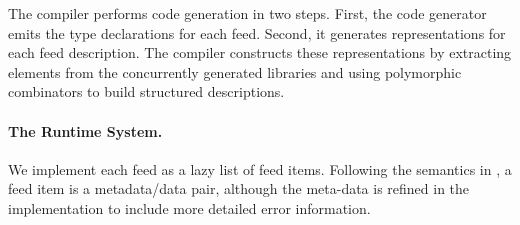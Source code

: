 The  compiler performs code generation in two steps.
First, the code generator emits the
type declarations for each feed.  
Second, it generates representations for each feed description.  
The compiler constructs these representations
by extracting elements from the concurrently
generated \padsml{} libraries
and using polymorphic combinators to build structured 
descriptions.  

\paragraph*{The Runtime System.}
We implement each \padsd{} feed as a lazy list of feed items. 
Following the semantics in , 
a feed item is a metadata/data pair, 
although the meta-data is refined in the implementation to include
more detailed error information.



